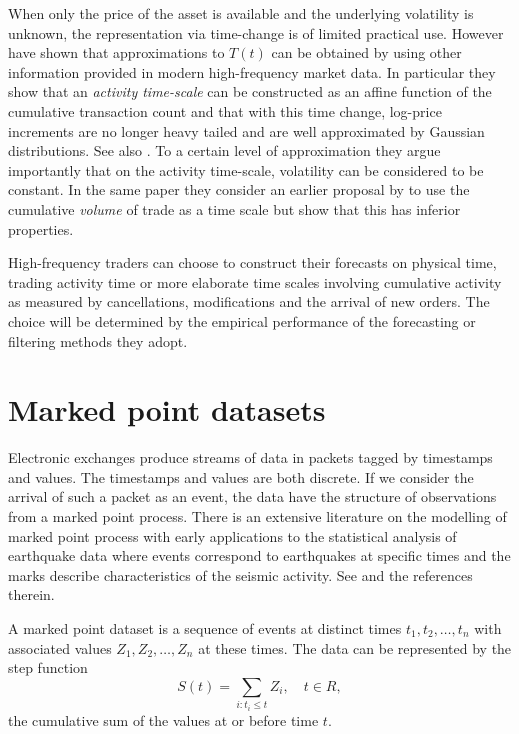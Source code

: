 When only the price of the asset is available and the underlying volatility is unknown, the representation via time-change is of limited practical use. However \citet{ane2000order} have shown that approximations to $T(t)$ can be obtained by using other information provided in modern high-frequency market data. In particular they show that an \emph{activity time-scale} can be constructed as an affine function of the cumulative transaction count and that with this time change, log-price increments are no longer heavy tailed and are well approximated by Gaussian distributions. See also \citet{easley1992time}. To a certain level of approximation they argue importantly that on the activity time-scale, volatility can be considered to be constant.  In the same paper they consider an earlier proposal by \citet{clark1973subordinated} to use the cumulative \emph{volume} of trade as a time scale but show that this has inferior properties.   

High-frequency traders can choose to construct their forecasts on physical time, trading activity time or more elaborate time scales involving cumulative activity as measured by cancellations, modifications and the arrival of new orders.  The choice will be determined by the empirical performance of the forecasting or filtering methods they adopt.      
   

\section{Marked point datasets}
Electronic exchanges produce streams of data in packets tagged by timestamps and values.  The timestamps and values are both discrete.  If we consider the arrival of such a packet as an event, the data have the structure of observations from a marked point process. There is an extensive literature on the modelling of marked point process with early applications to the statistical analysis of earthquake data where events correspond to earthquakes at specific times and the marks describe characteristics of the seismic activity. See \citet{cox1980point,ogata1988statistical,daley2007introduction} and the references therein.  

A marked point dataset is a sequence of events at distinct times $t_1,t_2,\dots,t_n$ with associated values $Z_1,Z_2,\dots,Z_n$ at these times. The data can be represented by the step function
\begin{equation}\label{eq:pricestep}S(t) = \sum_{i:t_i \leqslant t} Z_i, \quad  t \in R,\end{equation}
the cumulative sum of the values at or before time $t$.

